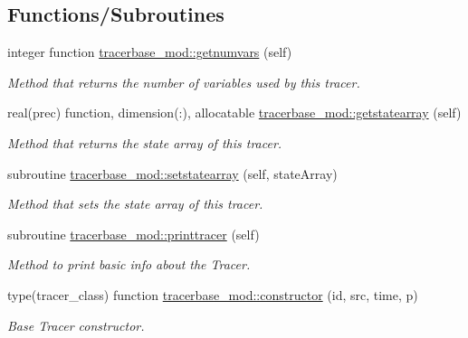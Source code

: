 \subsection*{Functions/\+Subroutines}
\begin{DoxyCompactItemize}
\item 
integer function \mbox{\hyperlink{namespacetracerbase__mod_a0be55b393be0846cbbe6be9feb3bb539}{tracerbase\+\_\+mod\+::getnumvars}} (self)
\begin{DoxyCompactList}\small\item\em Method that returns the number of variables used by this tracer. \end{DoxyCompactList}\item 
real(prec) function, dimension(\+:), allocatable \mbox{\hyperlink{namespacetracerbase__mod_adbdd85bd57f1a9debbe7b682099afb1d}{tracerbase\+\_\+mod\+::getstatearray}} (self)
\begin{DoxyCompactList}\small\item\em Method that returns the state array of this tracer. \end{DoxyCompactList}\item 
subroutine \mbox{\hyperlink{namespacetracerbase__mod_af85802e927b07e777b94375550246c16}{tracerbase\+\_\+mod\+::setstatearray}} (self, state\+Array)
\begin{DoxyCompactList}\small\item\em Method that sets the state array of this tracer. \end{DoxyCompactList}\item 
subroutine \mbox{\hyperlink{namespacetracerbase__mod_ae320123e374df674769dbd48ba5ef46f}{tracerbase\+\_\+mod\+::printtracer}} (self)
\begin{DoxyCompactList}\small\item\em Method to print basic info about the Tracer. \end{DoxyCompactList}\item 
type(tracer\+\_\+class) function \mbox{\hyperlink{namespacetracerbase__mod_aefc12c2007d7598ff9b35733b430a3a2}{tracerbase\+\_\+mod\+::constructor}} (id, src, time, p)
\begin{DoxyCompactList}\small\item\em Base Tracer constructor. \end{DoxyCompactList}\end{DoxyCompactItemize}
